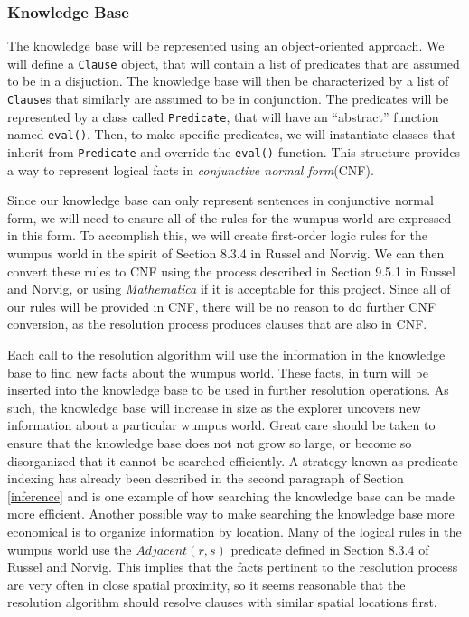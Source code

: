 \documentclass{article}
\begin{document}
			\subsubsection{Knowledge Base}
			
				The knowledge base will be represented using an object-oriented approach.
				We will define a \texttt{Clause} object, that will contain a list of predicates that are assumed to be in a disjuction. The knowledge base will then be characterized by a list of \texttt{Clause}s that similarly are assumed to be in conjunction. 
				The predicates will be represented by a class called \texttt{Predicate}, that will have an ``abstract'' function named \texttt{eval()}.
				Then, to make specific predicates, we will instantiate classes that inherit from \texttt{Predicate} and override the \texttt{eval()} function.
				This structure provides a way to represent logical facts in \textit{conjunctive normal form}(CNF).
				
				Since our knowledge base can only represent sentences in conjunctive normal form, we will need to ensure all of the rules for the wumpus world are expressed in this form.
				To accomplish this, we will create first-order logic rules for the wumpus world in the spirit of Section 8.3.4 in Russel and Norvig.
				We can then convert these rules to CNF using the process described in Section 9.5.1 in Russel and Norvig, or using \textit{Mathematica} if it is acceptable for this project.
				Since all of our rules will be provided in CNF, there will be no reason to do further CNF conversion, as the resolution process produces clauses that are also in CNF.
				
				Each call to the resolution algorithm will use the information in the knowledge base to find new facts about the wumpus world.
				These facts, in turn will be inserted into the knowledge base to be used in further resolution operations.
				As such, the knowledge base will increase in size as the explorer uncovers new information about a particular wumpus world.
				Great care should be taken to ensure that the knowledge base does not not grow so large, or become so disorganized that it cannot be searched efficiently.
				A strategy known as predicate indexing has already been described in the second paragraph of Section \ref{inference} and is one example of how searching the knowledge base can be made more efficient.
				Another possible way to make searching the knowledge base more economical is to organize information by location.
				Many of the logical rules in the wumpus world use the $Adjacent(r,s)$ predicate defined in Section 8.3.4 of Russel and Norvig.
				This implies that the facts pertinent to the resolution process are very often in close spatial proximity, so it seems reasonable that the resolution algorithm should resolve clauses with similar spatial locations first.
			
\end{document}

